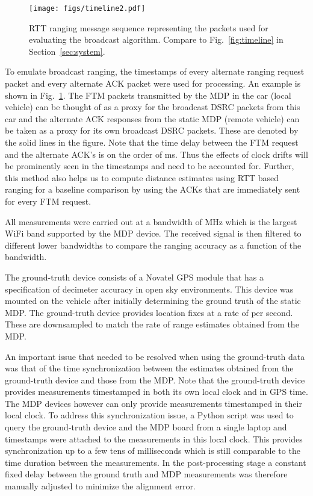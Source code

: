\documentclass[12pt,journal,final,onecolumn]{IEEEtran}
\theoremstyle{definition}
\theoremstyle{myremark}
\begin{document}
\begin{figure}[htbp]
    \centering 
    \texttt{[image: figs/timeline2.pdf]} 
    \caption{RTT ranging message sequence representing the packets used for 
        evaluating the broadcast algorithm. Compare to Fig.~\ref{fig:timeline}
        in Section~\ref{sec:system}.}
    \label{fig:ftmdsrc}
\end{figure}

To emulate broadcast ranging, the timestamps of every alternate ranging request
packet and every alternate ACK packet were used for processing. An example is
shown in Fig.~\ref{fig:ftmdsrc}. The FTM packets transmitted by the MDP in the
car (local vehicle) can be thought of as a proxy for the broadcast DSRC packets
from this car and the alternate ACK responses from the static MDP (remote
vehicle) can be taken as a proxy for its own broadcast DSRC packets. These are
denoted by the solid lines in the figure. Note that the time delay between the
FTM request and the alternate ACK's is on the order of  ms. Thus the
effects of clock drifts will be prominently seen in the timestamps and need to
be accounted for.  Further, this method also helps us to compute distance
estimates using RTT based ranging for a baseline comparison by using the ACKs
that are immediately sent for every FTM request. 

All measurements were carried out at a bandwidth of  MHz which is the
largest WiFi band supported by the MDP device. The received signal is then
filtered to different lower bandwidths to compare the ranging accuracy as a
function of the bandwidth.

The ground-truth device consists of a Novatel GPS module that has a
specification of decimeter accuracy in open sky environments. This device was
mounted on the vehicle after initially determining the ground truth of the
static MDP. The ground-truth device provides location fixes at a rate of 
per second. These are downsampled to match the rate of range estimates obtained
from the MDP. 

An important issue that needed to be resolved when using the ground-truth data
was that of the time synchronization between the estimates obtained from the
ground-truth device and those from the MDP. Note that the ground-truth device
provides measurements timestamped in both its own local clock and in GPS time.
The MDP devices however can only provide measurements timestamped in their local
clock. To address this synchronization issue, a Python script was used to query
the ground-truth device and the MDP board from a single laptop and timestamps
were attached to the measurements in this local clock. This provides
synchronization up to a few tens of milliseconds which is still comparable to
the time duration between the measurements. In the post-processing stage a
constant fixed delay between the ground truth and MDP measurements was therefore
manually adjusted to minimize the alignment error. 
\end{document}
